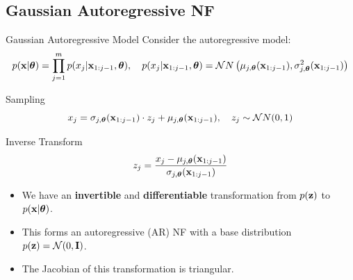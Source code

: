 \documentclass{beamer}
\begin{document}
\subsection{Gaussian Autoregressive NF}
\begin{frame}{Gaussian Autoregressive Model}
	Consider the autoregressive model:
	\vspace{-0.3cm}
	{\small
		\[
		p(\mathbf{x} | \boldsymbol{\theta}) = \prod_{j=1}^m p(x_j | \mathbf{x}_{1:j - 1}, \boldsymbol{\theta}), \quad
		p(x_j | \mathbf{x}_{1:j - 1}, \boldsymbol{\theta}) = \mathcal{N}{N} \left(\mu_{j, \boldsymbol{\theta}}(\mathbf{x}_{1:j-1}), \sigma^2_{j, \boldsymbol{\theta}} (\mathbf{x}_{1:j-1})\right)
		\]
	}
	\vspace{-0.5cm}
	\begin{block}{Sampling}
		\vspace{-0.3cm}
		\[
		x_j = \sigma_{j, \boldsymbol{\theta}} (\mathbf{x}_{1:j-1}) \cdot z_j + \mu_{j, \boldsymbol{\theta}}(\mathbf{x}_{1:j-1}), \quad z_j \sim \mathcal{N}{N}(0, 1)
		\]
		\vspace{-0.7cm}
	\end{block}
	\begin{block}{Inverse Transform}
		\vspace{-0.5cm}
		\[
		z_j = \frac{x_j - \mu_{j, \boldsymbol{\theta}}(\mathbf{x}_{1:j-1})}{\sigma_{j, \boldsymbol{\theta}} (\mathbf{x}_{1:j-1}) }
		\]
		\vspace{-0.4cm}
	\end{block}
	\begin{itemize}
		\item We have an \textbf{invertible} and \textbf{differentiable} transformation from $p(\mathbf{z})$ to $p(\mathbf{x} | \boldsymbol{\theta})$.
		\item This forms an autoregressive (AR) NF with a base distribution $p(\mathbf{z}) = \mathcal{N}(0, \mathbf{I})$.
		\item The Jacobian of this transformation is triangular.
	\end{itemize}
\end{frame}
\end{document}
